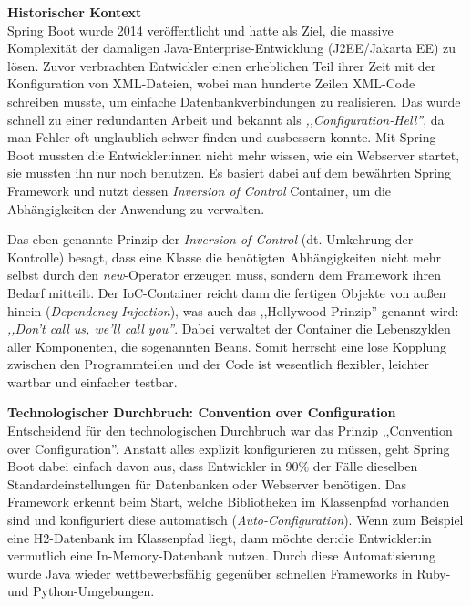 \textbf{Historischer Kontext} \cite{WhySpringBoot} \cite{SpringBootRelease} \\
Spring Boot wurde 2014 veröffentlicht und hatte als Ziel, die massive Komplexität der damaligen Java-Enterprise-Entwicklung (J2EE/Jakarta EE) zu lösen. Zuvor verbrachten Entwickler einen erheblichen Teil ihrer Zeit mit der Konfiguration von XML-Dateien, wobei man hunderte Zeilen XML-Code schreiben musste, um einfache Datenbankverbindungen zu realisieren. Das wurde schnell zu einer redundanten Arbeit und bekannt als  \textit{,,Configuration-Hell''}, da man Fehler oft unglaublich schwer finden und ausbessern konnte. Mit Spring Boot mussten die Entwickler:innen nicht mehr wissen, wie ein Webserver startet, sie mussten ihn nur noch benutzen. Es basiert dabei auf dem bewährten Spring Framework und nutzt dessen \textit{Inversion of Control} Container, um die Abhängigkeiten der Anwendung zu verwalten. \cite{MediumEvolutionOfSpringBoot} \cite{InnoQAnnotations}

Das eben genannte Prinzip der \textit{Inversion of Control} (dt. Umkehrung der Kontrolle) besagt, dass eine Klasse die benötigten Abhängigkeiten nicht mehr selbst durch den \textit{new}-Operator erzeugen muss, sondern dem Framework ihren Bedarf mitteilt. Der IoC-Container reicht dann die fertigen Objekte von außen hinein (\textit{Dependency Injection}), was auch das ,,Hollywood-Prinzip''\cite{HollywoodPrincipleIoC} genannt wird: \textit{,,Don't call us, we'll call you''}. Dabei verwaltet der Container die Lebenszyklen aller Komponenten,
 die sogenannten Beans.  Somit herrscht eine lose Kopplung zwischen den Programmteilen und der Code ist wesentlich flexibler, leichter wartbar und einfacher testbar. \cite{InversionOfControlAndBeans}


\vspace{0.7cm}
\textbf{Technologischer Durchbruch: Convention over Configuration} \\
Entscheidend für den technologischen Durchbruch war das Prinzip ,,Convention over Configuration''. Anstatt alles explizit konfigurieren zu müssen, geht Spring Boot dabei einfach davon aus, dass Entwickler in 90\% der Fälle dieselben Standardeinstellungen für Datenbanken oder Webserver benötigen. Das Framework erkennt beim Start, welche Bibliotheken im Klassenpfad vorhanden sind und konfiguriert diese automatisch (\textit{Auto-Configuration}). Wenn zum Beispiel eine H2-Datenbank im Klassenpfad liegt, dann möchte der:die Entwickler:in vermutlich eine In-Memory-Datenbank nutzen. Durch diese Automatisierung wurde Java wieder wettbewerbsfähig gegenüber schnellen Frameworks in Ruby- und Python-Umgebungen. \cite{InnoqMagicOfSpringBoot}

